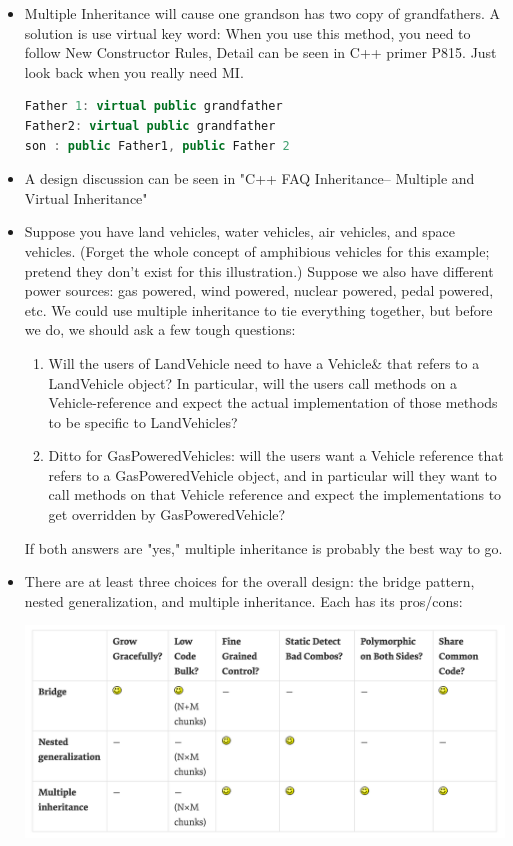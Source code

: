 \documentclass[a4paper,11pt,twoside]{book}
\begin{document}
\begin{itemize}
	\item Multiple Inheritance will cause one grandson has two copy of grandfathers. A solution is use virtual key word: When you use this method, you need to follow New Constructor Rules, Detail can be seen in C++ primer P815.  Just look back when you really need MI.
\begin{lstlisting}[frame=single, language=c++]
Father 1: virtual public grandfather
Father2: virtual public grandfather
son : public Father1, public Father 2
\end{lstlisting}
	
	\item A design discussion can be seen in "C++ FAQ Inheritance-- Multiple and Virtual Inheritance"
	\item Suppose you have land vehicles, water vehicles, air vehicles, and space vehicles. (Forget the whole concept of amphibious vehicles for this example; pretend they don't exist for this illustration.) Suppose we also have different power sources: gas powered, wind powered, nuclear powered, pedal powered, etc. We could use multiple inheritance to tie everything together, but before we do, we should ask a few tough questions:
	
	\begin{enumerate}
		\item Will the users of LandVehicle need to have a Vehicle\& that refers to a LandVehicle object? In particular, will the users call methods on a Vehicle-reference and expect the actual implementation of those methods to be specific to LandVehicles?
		
		\item Ditto for GasPoweredVehicles: will the users want a Vehicle reference that refers to a GasPoweredVehicle object, and in particular will they want to call methods on that Vehicle reference and expect the implementations to get overridden by GasPoweredVehicle?
	\end{enumerate}
	If both answers are "yes," multiple inheritance is probably the best way to go.
	
	\item There are at least three choices for the overall design: the bridge pattern, nested generalization, and multiple inheritance. Each has its pros/cons:
	
	\includegraphics[scale=0.4]{pics/MI.png}
	

\end{itemize}
\end{document}

